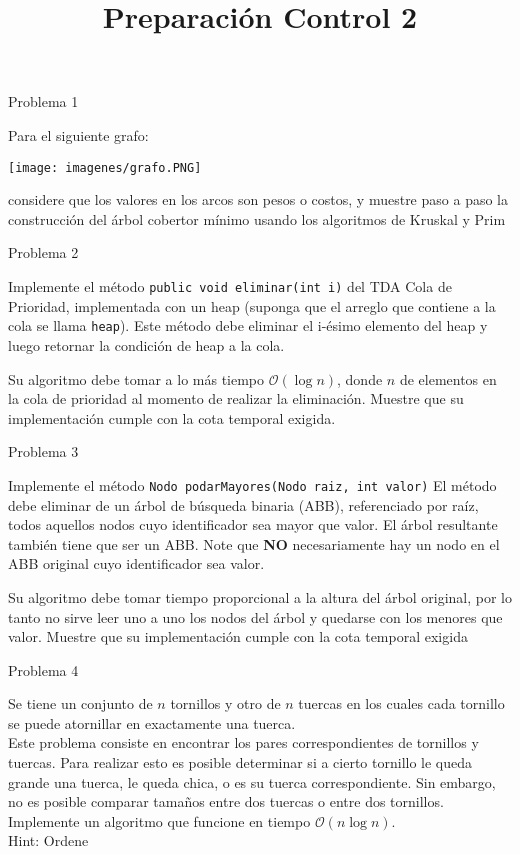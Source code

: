 \documentclass[dcc]{fcfmcourse}
\title{Preparación Control 2}
\begin{document}
\maketitle

\vspace{-1ex}
\begin{problems}
\problem Problema 1

Para el siguiente grafo:

\begin{center}
\texttt{[image: imagenes/grafo.PNG]}
\end{center}

considere que los valores en los arcos son pesos o costos, y muestre paso a paso la construcción del árbol cobertor mínimo usando los algoritmos de Kruskal y Prim

\problem Problema 2

Implemente el método \texttt{public void eliminar(int i)} del TDA Cola de Prioridad, implementada con un heap (suponga que el arreglo que contiene a la cola se llama \texttt{heap}). Este método debe eliminar el i-ésimo elemento del heap y luego retornar la condición de heap a la cola.

Su algoritmo debe tomar a lo más tiempo $\mathcal{O}(\log n)$, donde $n$ de elementos en la cola de prioridad al momento de realizar la eliminación. Muestre que su implementación cumple con la cota temporal exigida.

\problem Problema 3

Implemente el método \texttt{Nodo podarMayores(Nodo raiz, int valor)}
El método debe eliminar de un árbol de búsqueda binaria (ABB), referenciado por raíz, todos aquellos nodos cuyo identificador sea mayor que valor. El árbol resultante también tiene que ser un ABB. Note que \textbf{NO} necesariamente hay un nodo en el ABB original cuyo identificador sea valor.

Su algoritmo debe tomar tiempo proporcional a la altura del árbol original, por lo tanto no sirve leer uno a uno los nodos del árbol y quedarse con los menores que valor. Muestre que su implementación cumple con la cota temporal exigida

\problem Problema 4 

Se tiene un conjunto de $n$ tornillos y otro de $n$ tuercas en los cuales cada tornillo se puede atornillar en exactamente una tuerca.\\
Este problema consiste en encontrar los pares correspondientes de tornillos y tuercas. Para realizar esto es posible determinar si a cierto tornillo le queda grande una tuerca, le queda chica, o es su tuerca correspondiente. Sin embargo, no es posible comparar tamaños entre dos tuercas o entre dos tornillos.\\

Implemente un algoritmo que funcione en tiempo $\mathcal{O}(n\log n)$.\\
Hint: Ordene

\end{problems}
\end{document}
